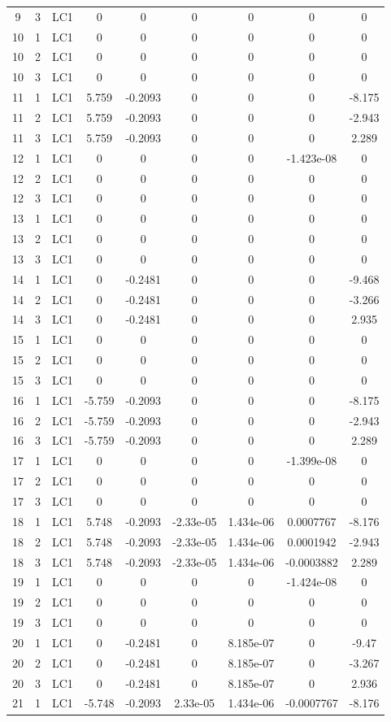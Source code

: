 \documentclass{article}%
\begin{document}
\begin{longtable}{| c c c | c c c c c c |}
9&3&LC1&0&0&0&0&0&0\\%
10&1&LC1&0&0&0&0&0&0\\%
10&2&LC1&0&0&0&0&0&0\\%
10&3&LC1&0&0&0&0&0&0\\%
11&1&LC1&5.759&{-}0.2093&0&0&0&{-}8.175\\%
11&2&LC1&5.759&{-}0.2093&0&0&0&{-}2.943\\%
11&3&LC1&5.759&{-}0.2093&0&0&0&2.289\\%
12&1&LC1&0&0&0&0&{-}1.423e{-}08&0\\%
12&2&LC1&0&0&0&0&0&0\\%
12&3&LC1&0&0&0&0&0&0\\%
13&1&LC1&0&0&0&0&0&0\\%
13&2&LC1&0&0&0&0&0&0\\%
13&3&LC1&0&0&0&0&0&0\\%
14&1&LC1&0&{-}0.2481&0&0&0&{-}9.468\\%
14&2&LC1&0&{-}0.2481&0&0&0&{-}3.266\\%
14&3&LC1&0&{-}0.2481&0&0&0&2.935\\%
15&1&LC1&0&0&0&0&0&0\\%
15&2&LC1&0&0&0&0&0&0\\%
15&3&LC1&0&0&0&0&0&0\\%
16&1&LC1&{-}5.759&{-}0.2093&0&0&0&{-}8.175\\%
16&2&LC1&{-}5.759&{-}0.2093&0&0&0&{-}2.943\\%
16&3&LC1&{-}5.759&{-}0.2093&0&0&0&2.289\\%
17&1&LC1&0&0&0&0&{-}1.399e{-}08&0\\%
17&2&LC1&0&0&0&0&0&0\\%
17&3&LC1&0&0&0&0&0&0\\%
18&1&LC1&5.748&{-}0.2093&{-}2.33e{-}05&1.434e{-}06&0.0007767&{-}8.176\\%
18&2&LC1&5.748&{-}0.2093&{-}2.33e{-}05&1.434e{-}06&0.0001942&{-}2.943\\%
18&3&LC1&5.748&{-}0.2093&{-}2.33e{-}05&1.434e{-}06&{-}0.0003882&2.289\\%
19&1&LC1&0&0&0&0&{-}1.424e{-}08&0\\%
19&2&LC1&0&0&0&0&0&0\\%
19&3&LC1&0&0&0&0&0&0\\%
20&1&LC1&0&{-}0.2481&0&8.185e{-}07&0&{-}9.47\\%
20&2&LC1&0&{-}0.2481&0&8.185e{-}07&0&{-}3.267\\%
20&3&LC1&0&{-}0.2481&0&8.185e{-}07&0&2.936\\%
21&1&LC1&{-}5.748&{-}0.2093&2.33e{-}05&1.434e{-}06&{-}0.0007767&{-}8.176\\%

\end{longtable}
\end{document}
